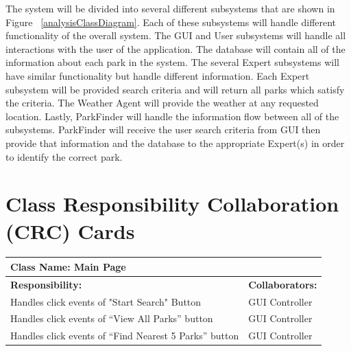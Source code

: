 \documentclass[titlepage,12pt]{article}
\begin{document}
The system will be divided into several different subsystems that are shown in Figure~
\ref{analysisClassDiagram}. Each of these subsystems will handle different functionality of the
overall system. The GUI and User subsystems will handle all interactions with the user of the
application. The database will contain all of the information about each park in the system. The
several Expert subsystems will have similar functionality but handle different information. Each
Expert subsystem will be provided search criteria and will return all parks which satisfy the
criteria. The Weather Agent will provide the weather at any requested location. Lastly, ParkFinder
will handle the information flow between all of the subsystems. ParkFinder will receive the user
search criteria from GUI then provide that information and the database to the appropriate Expert(s)
in order to identify the correct park.


    
\section{Class Responsibility Collaboration (CRC) Cards}
\label{sec:class_responsibility_collaboration_crc_cards}

%

    \begin{table}[H]
        \centering
        \begin{tabular}{|p{5cm}|p{5cm}|}
        \hline 
        \multicolumn{2}{|l|}{\textbf{Class Name: Main Page}} \\
        \hline
        \textbf{Responsibility:} & \textbf{Collaborators:} \\
        \hline
        Handles click events of "Start Search" Button & GUI Controller\\
        \hline
        Handles click events of “View All Parks” button	&	GUI Controller\\
        \hline
        Handles click events of “Find Nearest 5 Parks” button & GUI Controller
\\
\hline        \end{tabular}
    \end{table}
    
\end{document}
